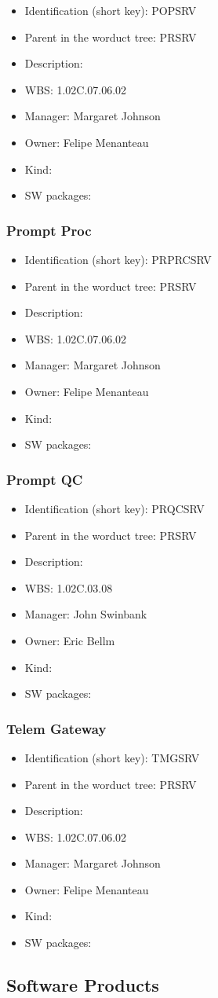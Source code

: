 \begin{itemize}\item Identification (short key): POPSRV
\item Parent in the worduct tree: PRSRV
\item Description: 
\item WBS: 1.02C.07.06.02
\item Manager: Margaret Johnson
\item Owner: Felipe Menanteau
\item Kind:
\item SW packages: 
\end{itemize}\subsubsection{Prompt Proc}
\begin{itemize}\item Identification (short key): PRPRCSRV
\item Parent in the worduct tree: PRSRV
\item Description: 
\item WBS: 1.02C.07.06.02
\item Manager: Margaret Johnson
\item Owner: Felipe Menanteau
\item Kind:
\item SW packages: 
\end{itemize}\subsubsection{Prompt QC}
\begin{itemize}\item Identification (short key): PRQCSRV
\item Parent in the worduct tree: PRSRV
\item Description: 
\item WBS: 1.02C.03.08
\item Manager: John Swinbank
\item Owner: Eric Bellm
\item Kind:
\item SW packages: 
\end{itemize}\subsubsection{Telem Gateway}
\begin{itemize}\item Identification (short key): TMGSRV
\item Parent in the worduct tree: PRSRV
\item Description: 
\item WBS: 1.02C.07.06.02
\item Manager: Margaret Johnson
\item Owner: Felipe Menanteau
\item Kind:
\item SW packages: 
\end{itemize}\subsection{Software Products}
